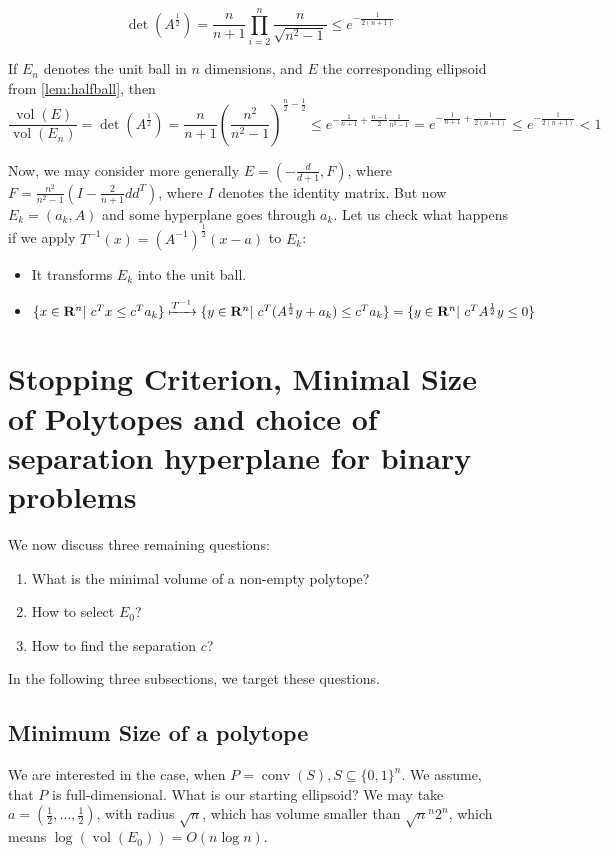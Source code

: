 \documentclass[10pt]{article}
\newcommand{\R}{\mathbf{R}}
\newcommand{\transpose}{T}
\newcommand{\vol}{\operatorname{vol}}
\newcommand{\conv}{\operatorname{conv}}
\begin{document}
\[
\det (A^{\frac{1}{2}}) = \frac{n}{n+1}\prod_{i=2}^n \frac{n}{\sqrt{n^2-1}} \le e^{-\frac{1}{2(n+1)}}
\]
\begin{corollary}
If $E_n$ denotes the unit ball in $n$ dimensions, and $E$ the corresponding ellipsoid from \autoref{lem:halfball}, then
\[
\frac{\vol (E)}{\vol (E_n)} = \det (A^{\frac{1}{2}}) = \frac{n}{n+1} \left(\frac{n^2}{n^2-1}\right)^{\frac{n}{2}-\frac{1}{2}} \le e^{-\frac{1}{n+1} + \frac{n-1}{2} \frac{1}{n^2-1}} = e^{-\frac{1}{n+1} + \frac{1}{2(n+1)}} \le e^{-\frac{1}{2(n+1)}}<1
\]
\end{corollary}
Now, we may consider more generally $E = (-\frac{d}{d+1}, F)$, where $F = \frac{n^2}{n^2-1} (I - \frac{2}{n+1} dd^\transpose)$, where $I$ denotes the identity matrix. But now $E_k = (a_k, A)$ and some hyperplane goes through $a_k$.  Let us check what happens if we apply $T^{-1} (x) = (A^{-1})^{\frac{1}{2}} (x-a)$ to $E_k$:
\begin{itemize}
\item It transforms $E_k$ into the unit ball. 
\item $\{x\in \R^n | c^\transpose x \le c^\transpose a_k \} \xmapsto{T^{-1}} \{y\in \R^n | c^\transpose (A^{\frac{1}{2}} y + a_k ) \le c^\transpose a_k\} = \{y \in \R^n | c^\transpose A^{\frac{1}{2}} y \le 0 \}$
\end{itemize}

\section{Stopping Criterion, Minimal Size of Polytopes and choice of separation hyperplane for binary problems}
We now discuss three remaining questions:
\begin{enumerate}
\item What is the minimal volume of a non-empty polytope?
\item How to select $E_0$?
\item How to find the separation $c$?
\end{enumerate}
In the following three subsections, we target these questions.
\subsection{Minimum Size of a polytope}
We are interested in the case, when $P = \conv (S), S \subseteq \{0,1\}^n$. We assume, that $P$ is full-dimensional. What is our starting ellipsoid? We may take $a = (\frac{1}{2}, \dots, \frac{1}{2})$, with radius $\sqrt{n}$, which has volume smaller than $\sqrt{n}^{n} 2^n$, which means $\log (\vol (E_0)) = O(n \log n)$. 
\end{document}
